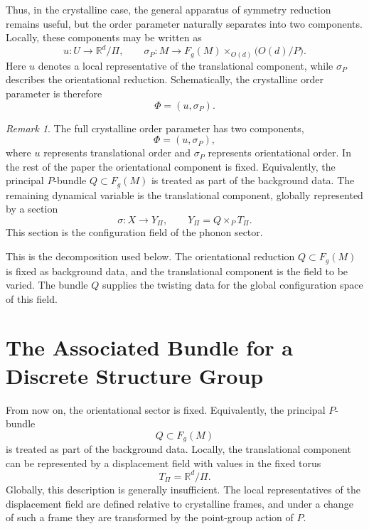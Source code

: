 \documentclass[11pt]{amsart}
\theoremstyle{plain}
\theoremstyle{definition}
\theoremstyle{remark}
\newtheorem{remark}[proposition]{Remark}
\begin{document}
Thus, in the crystalline case, the general apparatus of symmetry reduction remains useful, but the order parameter naturally separates into two components. 
Locally, these components may be written as
\begin{equation}
	u:U\to \mathbb R^d/\Pi,
	\qquad
	\sigma_P:M\to F_g(M)\times_{O(d)}\bigl(O(d)/P\bigr).
	\label{eq:two_components_order_parameter}
\end{equation}
Here \(u\) denotes a local representative of the translational component, while \(\sigma_P\) describes the orientational reduction. 
Schematically, the crystalline order parameter is therefore
\begin{equation}
	\Phi=(u,\sigma_P).
	\label{eq:order_parameter_pair_local}
\end{equation}

\begin{remark}
	\label{rem:scope_main_text}
	The full crystalline order parameter has two components,
	\[
	\Phi=(u,\sigma_P),
	\]
	where \(u\) represents translational order and \(\sigma_P\) represents orientational order. 
	In the rest of the paper the orientational component is fixed. 
	Equivalently, the principal \(P\)-bundle \(Q\subset F_g(M)\) is treated as part of the background data. 
	The remaining dynamical variable is the translational component, globally represented by a section
	\[
	\sigma:X\to Y_\Pi,
	\qquad
	Y_\Pi=Q\times_P T_\Pi.
	\]
	This section is the configuration field of the phonon sector.
\end{remark}

This is the decomposition used below. 
The orientational reduction \(Q\subset F_g(M)\) is fixed as background data, and the translational component is the field to be varied. 
The bundle \(Q\) supplies the twisting data for the global configuration space of this field.

\section{The Associated Bundle for a Discrete Structure Group}
\label{sec:associated_bundle}

From now on, the orientational sector is fixed. 
Equivalently, the principal \(P\)-bundle
\[
Q\subset F_g(M)
\]
is treated as part of the background data. 
Locally, the translational component can be represented by a displacement field with values in the fixed torus
\[
T_\Pi=\mathbb R^d/\Pi.
\]
Globally, this description is generally insufficient. 
The local representatives of the displacement field are defined relative to crystalline frames, and under a change of such a frame they are transformed by the point-group action of \(P\).
\end{document}

